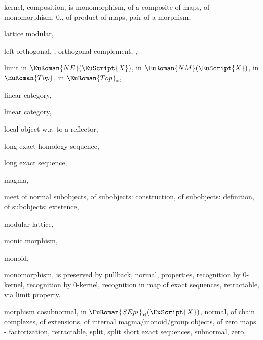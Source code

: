 \documentclass [12pt,oneside]{book}%
\theoremstyle{captionstyle}  %
\newcommand{\Tops}{\EuRoman{Top}}											%
\newcommand{\TopsBsd}{\EuRoman{Top}_{\ast}}	%
\newcommand{\ZeroObject}{0}                           %
\newcommand{\Ctgry}[1]{\EuScript{#1}}					%
\newcommand{\NMonoCat}[1]{\EuRoman{NM}(\Ctgry{#1})}				%
\newcommand{\NEpiCat}[1]{\EuRoman{NE}(\Ctgry{#1})}				%
\newcommand{\SEpisInOver}[2]{\EuRoman{SEpi}_{#2}(\Ctgry{#1})}								%
\begin{document}
\begin{theindex}
    \item kernel, 
    \subitem composition, 
    \subitem is monomorphism, 
    \subitem of a composite of maps, 
    \subitem of monomorphism: $\ZeroObject $., 
    \subitem of product of maps, 
    \subitem pair of a morphism, 

    \indexspace

    \item lattice
    \subitem modular, 
    \item left
    \subitem orthogonal, , 
    \subitem orthogonal complement, , 
    \item limit
    \subitem in $\NEpiCat {X}$, 
    \subitem in $\NMonoCat {X}$, 
    \subitem in $\Tops $, 
    \subitem in $\TopsBsd $, 
    \item linear
    \subitem category, 
    \item linear category, 
    \item local
    \subitem object w.r. to a reflector, 
    \item long exact homology sequence, 
    \item long exact sequence, 

    \indexspace

    \item magma, 
    \item meet
    \subitem of normal subobjects, 
    \subitem of subobjects: construction, 
    \subitem of subobjects: definition, 
    \subitem of subobjects: existence, 
    \item modular lattice, 
    \item monic morphism, 
    \item monoid, 
    \item monomorphism, 
    \subitem is preserved by pullback, 
    \subitem normal, 
    \subitem properties, 
    \subitem recognition by $0$-kernel, 
    \subitem recognition by $\ZeroObject $-kernel, 
    \subitem recognition in map of exact sequences, 
    \subitem retractable, 
    \subitem via limit property, 
    \item morphism
    \subitem cosubnormal, 
    \subitem in $\SEpisInOver {X}{R}$, 
    \subitem normal, 
    \subitem of chain complexes, 
    \subitem of extensions, 
    \subitem of internal magma/monoid/group objects, 
    \subitem of zero maps - factorization, 
    \subitem retractable, 
    \subitem split, 
    \subitem split short exact sequences, 
    \subitem subnormal, 
    \subitem zero, 


\end{theindex}
\end{document}
